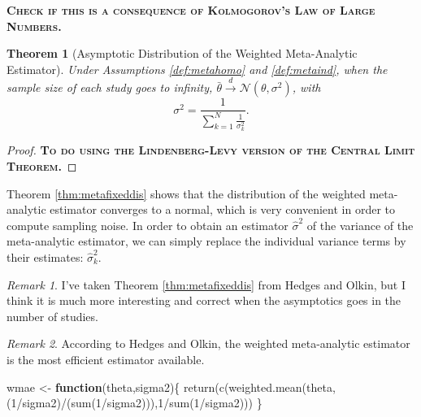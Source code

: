 \documentclass[
]{book}
\newenvironment{Shaded}{\begin{snugshade}}{\end{snugshade}}
\newcommand{\ControlFlowTok}[1]{\textcolor[rgb]{0.13,0.29,0.53}{\textbf{#1}}}
\newcommand{\DecValTok}[1]{\textcolor[rgb]{0.00,0.00,0.81}{#1}}
\newcommand{\FunctionTok}[1]{\textcolor[rgb]{0.00,0.00,0.00}{#1}}
\newcommand{\NormalTok}[1]{#1}
\newcommand{\OtherTok}[1]{\textcolor[rgb]{0.56,0.35,0.01}{#1}}
\newcommand{\SpecialCharTok}[1]{\textcolor[rgb]{0.00,0.00,0.00}{#1}}
\newtheorem{theorem}{Theorem}[chapter]
\theoremstyle{definition}
\theoremstyle{definition}
\theoremstyle{definition}
\theoremstyle{definition}
\theoremstyle{remark}
\newtheorem*{remark}{Remark}
\begin{document}
\textbf{\textsc{Check if this is a consequence of Kolmogorov's Law of Large Numbers.}}

\begin{theorem}[Asymptotic Distribution of the Weighted Meta-Analytic Estimator]
\protect\hypertarget{thm:metafixeddis}{}{\label{thm:metafixeddis} \iffalse (Asymptotic Distribution of the Weighted Meta-Analytic Estimator) \fi{} }Under Assumptions \ref{def:metahomo} and \ref{def:metaind}, when the sample size of each study goes to infinity, \(\bar{\theta}\stackrel{d}{\rightarrow}\mathcal{N}(\theta,\sigma^2)\), with
\[
\sigma^2 = \frac{1}{\sum_{k=1}^N\frac{1}{\sigma^2_k}}.
\]
\end{theorem}

\begin{proof}
\iffalse{} {Proof. } \fi{}\textbf{\textsc{To do using the Lindenberg-Levy version of the Central Limit Theorem.}}
\end{proof}

Theorem \ref{thm:metafixeddis} shows that the distribution of the weighted meta-analytic estimator converges to a normal, which is very convenient in order to compute sampling noise.
In order to obtain an estimator \(\hat{\sigma}^2\) of the variance of the meta-analytic estimator, we can simply replace the individual variance terms by their estimates: \(\hat{\sigma}_k^2\).

\begin{remark}
\iffalse{} {Remark. } \fi{}I've taken Theorem \ref{thm:metafixeddis} from Hedges and Olkin, but I think it is much more interesting and correct when the asymptotics goes in the number of studies.
\end{remark}

\begin{remark}
\iffalse{} {Remark. } \fi{}According to Hedges and Olkin, the weighted meta-analytic estimator is the most efficient estimator available.
\end{remark}

\begin{Shaded}
\begin{Highlighting}[]
\NormalTok{wmae }\OtherTok{\textless{}{-}} \ControlFlowTok{function}\NormalTok{(theta,sigma2)\{}
  \FunctionTok{return}\NormalTok{(}\FunctionTok{c}\NormalTok{(}\FunctionTok{weighted.mean}\NormalTok{(theta,(}\DecValTok{1}\SpecialCharTok{/}\NormalTok{sigma2)}\SpecialCharTok{/}\NormalTok{(}\FunctionTok{sum}\NormalTok{(}\DecValTok{1}\SpecialCharTok{/}\NormalTok{sigma2))),}\DecValTok{1}\SpecialCharTok{/}\FunctionTok{sum}\NormalTok{(}\DecValTok{1}\SpecialCharTok{/}\NormalTok{sigma2)))}
\NormalTok{\}}
\end{Highlighting}
\end{Shaded}
\end{document}
